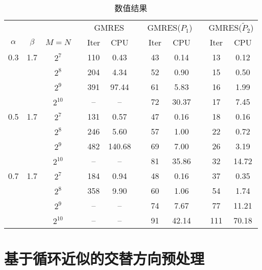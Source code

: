 \documentclass{ecnumaster}
\begin{document}
\begin{table}[H]
\centering
\caption{数值结果} \label{tab4-2-3}\smallskip
\begin{tabular}{cccccccccccc} \toprule
& &  && \multicolumn{2}{c}{GMRES} && \multicolumn{2}{c}{GMRES($P_1$)}
&& \multicolumn{2}{c}{GMRES($\tilde{P}_2$)} \\
$\alpha$ & $\beta$ & $M = N$ && Iter & CPU && Iter & CPU && Iter & CPU\\ \midrule
0.3 & 1.7
 & $2^7$    && 110 & 0.43   && 43 &0.14   && 13 & 0.12\\
&& $2^8$    && 204 & 4.34   && 52 &0.90   && 15 & 0.50\\
&& $2^9$    && 391 & 97.44  && 61 &5.83   && 16 & 1.99\\
&& $2^{10}$ && --  & --     && 72 &30.37  && 17 & 7.45\\  \midrule
0.5 & 1.7
 & $2^7$    && 131 & 0.57   && 47 &0.16   && 18 & 0.16\\
&& $2^8$    && 246 & 5.60   && 57 &1.00   && 22 & 0.72 \\
&& $2^9$    && 482 & 140.68 && 69 &7.00   && 26 & 3.19 \\
&& $2^{10}$ && --  & --     && 81 &35.86  && 32 & 14.72 \\ \midrule
0.7 & 1.7
 & $2^7$    && 184 & 0.94   && 48 &0.16   && 37 & 0.35 \\
&& $2^8$    && 358 & 9.90   && 60 &1.06   && 54 & 1.74 \\
&& $2^9$    && --  & --     && 74 &7.67   && 77 & 11.21 \\
&& $2^{10}$ && --  & --     && 91 &42.14  && 111 & 70.18 \\ \bottomrule
\end{tabular}
\end{table}


\section{基于循环近似的交替方向预处理}
\end{document}

